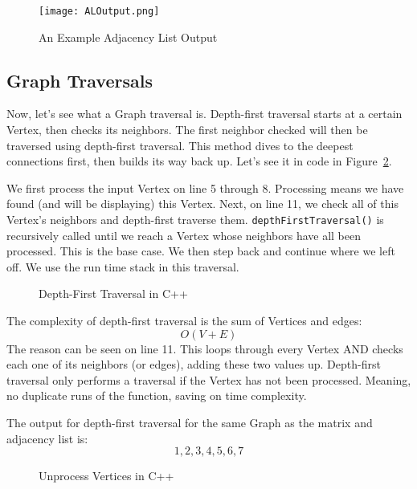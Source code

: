 \documentclass[letterpaper, 10pt,DIV=13]{scrartcl}
\numberwithin{equation}{section} %
\numberwithin{figure}{section} %
\numberwithin{table}{section} %
\begin{document}
\begin{figure}[h] 
    \centering 
    \texttt{[image: ALOutput.png]}
    \caption{An Example Adjacency List Output}
    \label{figure:ALOutput}
    
\end{figure}

\pagebreak


\subsection{Graph Traversals}
Now, let's see what a Graph traversal is. Depth-first traversal starts at a certain Vertex, then checks its neighbors. The first neighbor checked will then be traversed using depth-first traversal. This method dives to the deepest connections first, then builds its way back up. Let's see it in code in Figure~\ref{figure:DFTCode}.

We first process the input Vertex on line 5 through 8. Processing means we have found (and will be displaying) this Vertex. Next, on line 11, we check all of this Vertex's neighbors and depth-first traverse them. \texttt{depthFirstTraversal()} is recursively called until we reach a Vertex whose neighbors have all been processed. This is the base case. We then step back and continue where we left off. We use the run time stack in this traversal.


\begin{figure}[h] 
    \centering 
    
    \caption{Depth-First Traversal in C++}
    \label{figure:DFTCode}
\end{figure}

The complexity of depth-first traversal is the sum of Vertices and edges:
\[O(V + E)\] 
The reason can be seen on line 11. This loops through every Vertex AND checks each one of its neighbors (or edges), adding these two values up. Depth-first traversal only performs a traversal if the Vertex has not been processed. Meaning, no duplicate runs of the function, saving on time complexity.

The output for depth-first traversal for the same Graph as the matrix and adjacency list is:
\[1, 2, 3, 4, 5, 6, 7\] 



\begin{figure}[h] 
    \centering 
    
    \caption{Unprocess Vertices in C++}
    \label{figure:Unprocess}
\end{figure}
\end{document}
